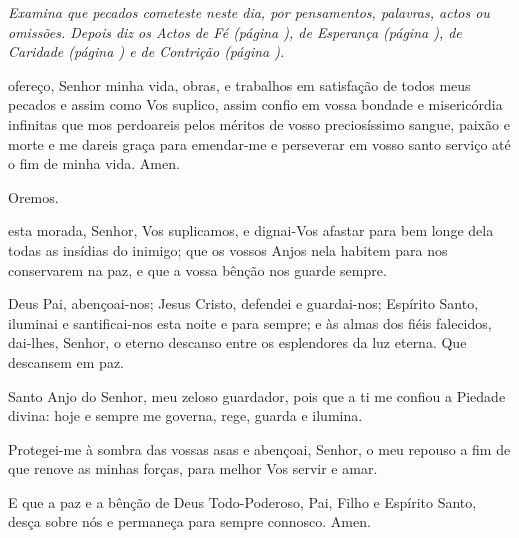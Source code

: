 
\emph{Examina que pecados cometeste neste dia, por pensamentos, palavras, actos ou omissões. Depois diz os Actos de Fé (página \pageref{actofe}), de Esperança (página \pageref{actoesperanca}), de Caridade (página \pageref{actocaridade}) e de Contrição (página \pageref{actocontricao}).}\par

 ofereço, Senhor minha vida, obras, e trabalhos em satisfação de todos meus pecados e assim como Vos suplico, assim confio em vossa bondade e misericórdia infinitas que mos perdoareis pelos méritos de vosso preciosíssimo sangue, paixão e morte e me dareis graça para emendar-me e perseverar em vosso santo serviço até o fim de minha vida. Amen.


\begin{nscenter} Oremos. \end{nscenter}

 esta morada, Senhor, Vos suplicamos, e dignai-Vos afastar para bem longe dela todas as insídias do inimigo; que os vossos Anjos nela habitem para nos conservarem na paz, e que a vossa bênção nos guarde sempre.\par
Deus Pai, abençoai-nos; Jesus Cristo, defendei e guardai-nos; Espírito Santo, iluminai e santificai-nos esta noite e para sempre; e às almas dos fiéis falecidos, dai-lhes, Senhor, o eterno descanso entre os esplendores da luz eterna. Que descansem em paz.\par
Santo Anjo do Senhor, meu zeloso guardador, pois que a ti me confiou a Piedade divina: hoje e sempre me governa, rege, guarda e ilumina.\par
Protegei-me à sombra das vossas asas e abençoai, Senhor, o meu repouso a fim de que renove as minhas forças, para melhor Vos servir e amar.\par
E que a paz e a bênção de Deus Todo-Poderoso, Pai, Filho \cruz e Espírito Santo, desça sobre nós e permaneça para sempre connosco. Amen.
